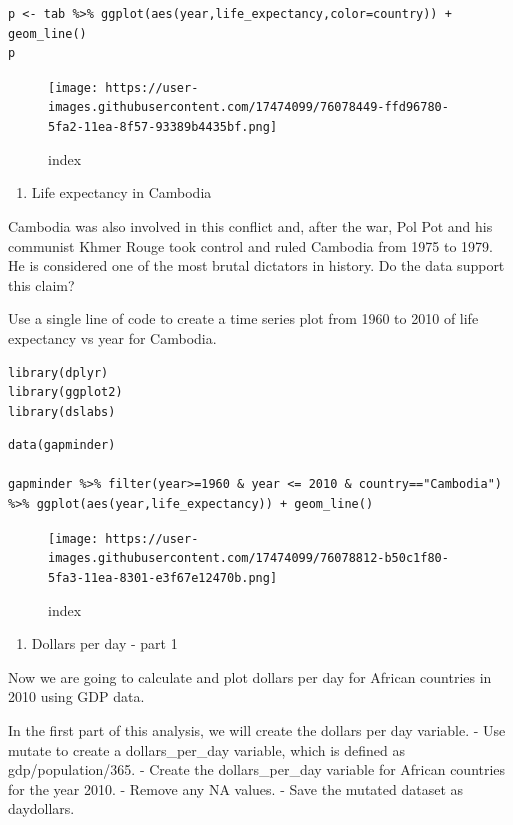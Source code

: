 \documentclass[
]{article}
\providecommand{\tightlist}{%
  \setlength{\itemsep}{0pt}\setlength{\parskip}{0pt}}
\begin{document}
\begin{verbatim}
p <- tab %>% ggplot(aes(year,life_expectancy,color=country)) + geom_line()
p
\end{verbatim}

\begin{figure}
\centering
\texttt{[image: https://user-images.githubusercontent.com/17474099/76078449-ffd96780-5fa2-11ea-8f57-93389b4435bf.png]}
\caption{index}
\end{figure}

\begin{enumerate}
\def\labelenumi{\arabic{enumi}.}
\setcounter{enumi}{5}
\tightlist
\item
  Life expectancy in Cambodia
\end{enumerate}

Cambodia was also involved in this conflict and, after the war, Pol Pot
and his communist Khmer Rouge took control and ruled Cambodia from 1975
to 1979. He is considered one of the most brutal dictators in history.
Do the data support this claim?

Use a single line of code to create a time series plot from 1960 to 2010
of life expectancy vs year for Cambodia.

\begin{verbatim}
library(dplyr)
library(ggplot2)
library(dslabs)
\end{verbatim}

\begin{verbatim}
data(gapminder)

gapminder %>% filter(year>=1960 & year <= 2010 & country=="Cambodia") %>% ggplot(aes(year,life_expectancy)) + geom_line()
\end{verbatim}

\begin{figure}
\centering
\texttt{[image: https://user-images.githubusercontent.com/17474099/76078812-b50c1f80-5fa3-11ea-8301-e3f67e12470b.png]}
\caption{index}
\end{figure}

\begin{enumerate}
\def\labelenumi{\arabic{enumi}.}
\setcounter{enumi}{6}
\tightlist
\item
  Dollars per day - part 1
\end{enumerate}

Now we are going to calculate and plot dollars per day for African
countries in 2010 using GDP data.

In the first part of this analysis, we will create the dollars per day
variable. - Use mutate to create a dollars\_per\_day variable, which is
defined as gdp/population/365. - Create the dollars\_per\_day variable
for African countries for the year 2010. - Remove any NA values. - Save
the mutated dataset as daydollars.
\end{document}
